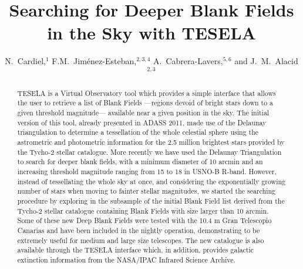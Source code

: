 
\resetcounters





\title{Searching for Deeper Blank Fields in the Sky with TESELA}
\author{N.~Cardiel,$^1$ F.M.~Jim\'{e}nez-Esteban,$^{2,3,4}$
A.~Cabrera-Lavers,$^{5,6}$ and J.~M.~Alacid$^{2,3}$
}


\begin{abstract}
TESELA is a Virtual Observatory tool which provides a simple interface that
allows the user to retrieve a list of Blank Fields ---regions devoid of bright
stars down to a given threshold magnitude--- available near a given position in
the sky. The initial version of this tool, already presented in ADASS 2011,
made use of the Delaunay triangulation to determine a tessellation of the whole
celestial sphere using the astrometric and photometric information for the 2.5
million brightest stars provided by the Tycho-2 stellar catalogue. More
recently we have used the Delaunay Triangulation to search for deeper blank
fields, with a minimum diameter of 10 arcmin and an increasing threshold
magnitude ranging from 15 to 18 in USNO-B R-band. However, instead of
tessellating the whole sky at once, and considering the exponentially growing
number of stars when moving to fainter stellar magnitudes, we started the
searching procedure by exploring in the subsample of the initial Blank Field
list derived from the Tycho-2 stellar catalogue containing Blank Fields with
size larger than 10 arcmin. Some of these new Deep Blank Fields were
tested with the 10.4 m Gran Telescopio Canarias and have been included in the
nightly operation, demonstrating to be extremely
useful for medium and large size telescopes. The new catalogue is also
available through the TESELA interface which, in addition, provides galactic
extinction information from the NASA/IPAC Infrared Science Archive. 
\end{abstract}

